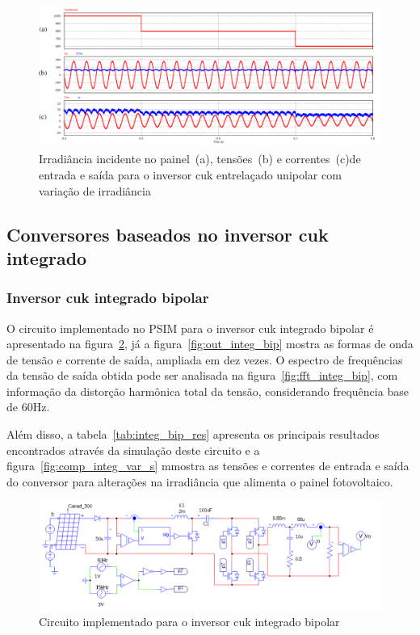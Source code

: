 \documentclass[
	12pt,				%
	openany,
	onseside,
	a4paper,			%
	english,			%
	french,				%
	spanish,			%
	brazil,				%
	]{abntex2}
\begin{document}
\begin{figure}[H]%
	\captionsetup{justification=centering}
	\centering
		\includegraphics[width= \linewidth]{comp_interv_var_s_unip}
		\caption{Irradiância incidente no painel~(a), tensões~(b) e correntes~(c)de entrada e saída para o inversor cuk entrelaçado unipolar com variação de irradiância}
		\label{fig:comp_interv_var_s_unip}
\end{figure}

\subsection{Conversores baseados no inversor cuk integrado}

\subsubsection{Inversor cuk integrado bipolar}

O circuito implementado no PSIM para o inversor cuk integrado bipolar é apresentado na figura~\ref{fig:comp_integ_circ_clean}, já a figura~\ref{fig:out_integ_bip} mostra as formas de onda de tensão e corrente de saída, ampliada em dez vezes. O espectro de frequências da tensão de saída obtida pode ser analisada na figura~\ref{fig:fft_integ_bip},  com informação da distorção harmônica total da tensão, considerando frequência base de 60Hz.

Além disso, a tabela~\ref{tab:integ_bip_res} apresenta os principais resultados encontrados através da simulação deste circuito e a figura~\ref{fig:comp_integ_var_s} mmostra as tensões e correntes de entrada e saída do conversor para alterações na irradiância que alimenta o painel fotovoltaico.

\begin{figure}[H]%
	\captionsetup{justification=centering}
	\centering
		\includegraphics[width= \linewidth]{comp_integ_circ_clean}
		\caption{Circuito implementado para o inversor cuk integrado bipolar}
		\label{fig:comp_integ_circ_clean}
\end{figure}
\end{document}
